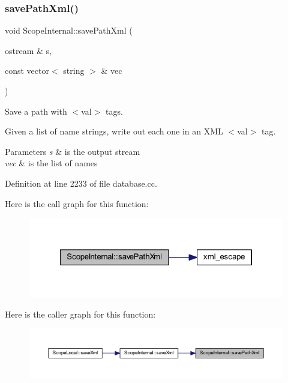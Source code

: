 \subsubsection{\texorpdfstring{savePathXml()}{savePathXml()}}
{\footnotesize\ttfamily void Scope\+Internal\+::save\+Path\+Xml (\begin{DoxyParamCaption}\item[{ostream \&}]{s,  }\item[{const vector$<$ string $>$ \&}]{vec }\end{DoxyParamCaption})\hspace{0.3cm}{\ttfamily [static]}}



Save a path with $<$val$>$ tags. 

Given a list of name strings, write out each one in an X\+ML $<$val$>$ tag. 
\begin{DoxyParams}{Parameters}
{\em s} & is the output stream \\
\hline
{\em vec} & is the list of names \\
\hline
\end{DoxyParams}


Definition at line 2233 of file database.\+cc.

Here is the call graph for this function\+:
\nopagebreak
\begin{figure}[H]
\begin{center}
\leavevmode
\includegraphics[width=322pt]{class_scope_internal_adf1804d94e0238692125668e0813ac94_cgraph}
\end{center}
\end{figure}
Here is the caller graph for this function\+:
\nopagebreak
\begin{figure}[H]
\begin{center}
\leavevmode
\includegraphics[width=350pt]{class_scope_internal_adf1804d94e0238692125668e0813ac94_icgraph}
\end{center}
\end{figure}
\mbox{\label{class_scope_internal_af73cb738b4a29cf9aa076ce382ff110f}} 
